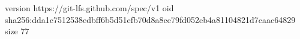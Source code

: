 version https://git-lfs.github.com/spec/v1
oid sha256:dda1c7512538edbff6b5d51efb70d8a8ce79fd052eb4a81104821d7caac64829
size 77
